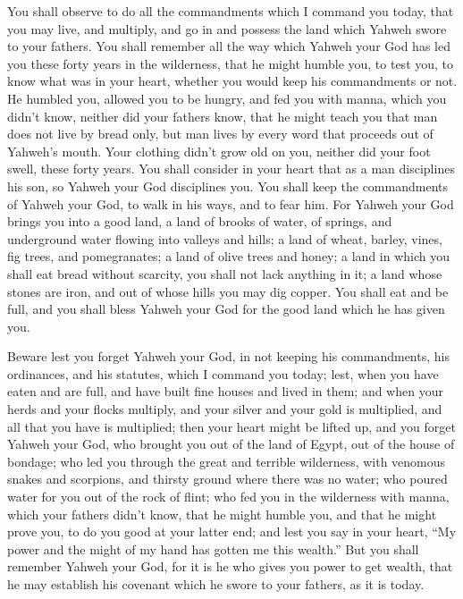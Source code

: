  You shall observe to do all the commandments which I
command you today, that you may live, and multiply, and go in and
possess the land which Yahweh swore to your fathers.  You
shall remember all the way which Yahweh your God has led you these forty
years in the wilderness, that he might humble you, to test you, to know
what was in your heart, whether you would keep his commandments or not.
 He humbled you, allowed you to be hungry, and fed you
with manna, which you didn't know, neither did your fathers know, that
he might teach you that man does not live by bread only, but man lives
by every word that proceeds out of Yahweh's mouth.  Your
clothing didn't grow old on you, neither did your foot swell, these
forty years.  You shall consider in your heart that as a
man disciplines his son, so Yahweh your God disciplines you.
 You shall keep the commandments of Yahweh your God, to
walk in his ways, and to fear him.  For Yahweh your God
brings you into a good land, a land of brooks of water, of springs, and
underground water flowing into valleys and hills;  a land
of wheat, barley, vines, fig trees, and pomegranates; a land of olive
trees and honey;  a land in which you shall eat bread
without scarcity, you shall not lack anything in it; a land whose stones
are iron, and out of whose hills you may dig copper.  You
shall eat and be full, and you shall bless Yahweh your God for the good
land which he has given you.

 Beware lest you forget Yahweh your God, in not keeping
his commandments, his ordinances, and his statutes, which I command you
today;  lest, when you have eaten and are full, and have
built fine houses and lived in them;  and when your herds
and your flocks multiply, and your silver and your gold is multiplied,
and all that you have is multiplied;  then your heart
might be lifted up, and you forget Yahweh your God, who brought you out
of the land of Egypt, out of the house of bondage;  who
led you through the great and terrible wilderness, with venomous snakes
and scorpions, and thirsty ground where there was no water; who poured
water for you out of the rock of flint;  who fed you in
the wilderness with manna, which your fathers didn't know, that he might
humble you, and that he might prove you, to do you good at your latter
end;  and lest you say in your heart, ``My power and the
might of my hand has gotten me this wealth.''  But you
shall remember Yahweh your God, for it is he who gives you power to get
wealth, that he may establish his covenant which he swore to your
fathers, as it is today.

